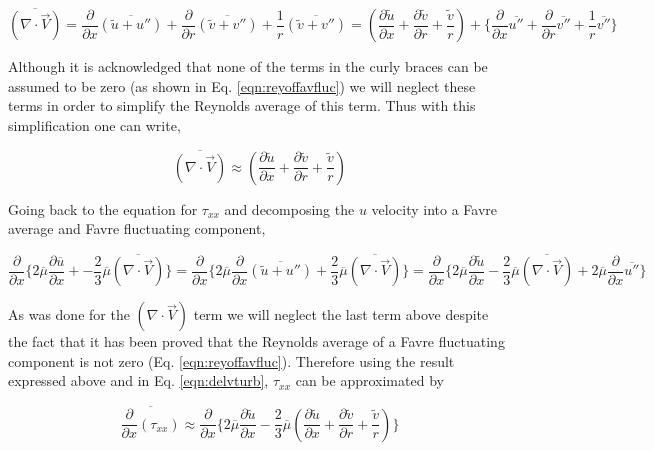 \begin{displaymath}
	\overline{(\nabla \cdot \vec{V})} = \frac{\partial}{\partial x}\overline{(\tilde{u}+u'')} + 
	\frac{\partial}{\partial r}\overline{(\tilde{v}+v'')} +
	\frac{1}{r}\overline{(\tilde{v}+v'')} = (\frac{\partial \tilde{u}}{\partial x} + \frac{\partial \tilde{v}}
	{\partial r} + \frac{\tilde{v}}{r}) + \Big\{\frac{\partial}{\partial x}\overline{u''} + \frac{\partial}{\partial r}
	\overline{v''} + \frac{1}{r}\overline{v''}\Big\}
\end{displaymath}

	Although it is acknowledged that none of the terms in the curly braces can be assumed to be zero (as shown in 
Eq. \ref{eqn:reyoffavfluc}) we will neglect these terms in order to simplify the Reynolds average of this
term.  Thus with this simplification one can write,

\begin{equation}
	\overline{(\nabla \cdot \vec{V})} \approx (\frac{\partial \tilde{u}}{\partial x} + \frac{\partial \tilde{v}}
	{\partial r} + \frac{\tilde{v}}{r}) 
\label{eqn:delvturb}
\end{equation}

	Going back to the equation for $\tau_{xx}$ and decomposing the $u$ velocity into a Favre average and
Favre fluctuating component,

\begin{displaymath}
	\frac{\partial}{\partial x}\Big\{
	2 \overline{\mu} \frac{\partial \overline{u}}{\partial x} + 
	- \frac{2}{3}\overline{\mu} \overline{(\nabla \cdot \vec{V})} \Big\} = \frac{\partial}{\partial x}\Big\{
	2 \overline{\mu} \frac{\partial}{\partial x}\overline{(\tilde{u}+u'')} + 
	\frac{2}{3}\overline{\mu} \overline{(\nabla \cdot \vec{V})} \Big\} = \frac{\partial}{\partial x}\Big\{
	2\overline{\mu}\frac{\partial \tilde{u}}{\partial x} - \frac{2}{3}\overline{\mu} \overline{(\nabla \cdot \vec{V})}
	+2\overline{\mu}\frac{\partial}{\partial x}\overline{u''}\Big\}
\end{displaymath}

	As was done for the $(\nabla \cdot \vec{V})$ term we will neglect the last term above despite the fact that
it has been proved that the Reynolds average of a Favre fluctuating component is not zero (Eq. \ref{eqn:reyoffavfluc}).
Therefore using the result expressed above and in Eq. \ref{eqn:delvturb}, $\tau_{xx}$ can be approximated by

\begin{equation}
	\overline{\frac{\partial}{\partial x}(\tau_{xx})} \approx \frac{\partial}{\partial x}\Big\{
	2\overline{\mu}\frac{\partial \tilde{u}}{\partial x} - \frac{2}{3}\overline{\mu} (\frac{\partial \tilde{u}}
	{\partial x} + \frac{\partial \tilde{v}}{\partial r} + \frac{\tilde{v}}{r}) 
	\Big\}
\label{eqn:tauxxturb}
\end{equation}

